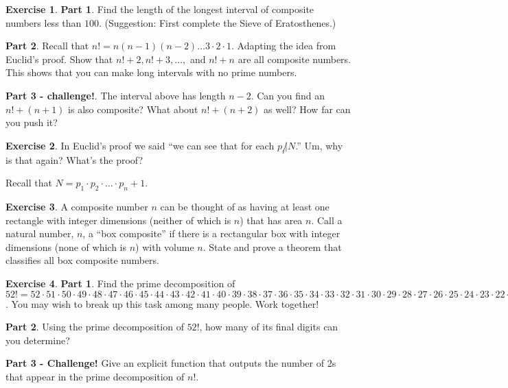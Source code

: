 \documentclass[11pt]{article}
\theoremstyle{definition}
\newtheorem{exercise}{Exercise}
\numberwithin{thm}{section}
\begin{document}
\begin{exercise} \textbf{Part 1}. Find the length of the longest interval of composite numbers less than $100$. (Suggestion: First complete the Sieve of Eratosthenes.)

\textbf{Part 2}. Recall that $n! = n(n-1)(n-2) \ldots 3 \cdot 2 \cdot 1$. Adapting the idea from Euclid's proof. Show that $n!+2, n!+3, \ldots,$ and $n!+ n$ are all composite numbers. This shows that you can make long intervals with no prime numbers.

\textbf{Part 3 - challenge!}. The interval above has length $n-2$. Can you find an $n!+ (n + 1)$ is also composite? What about $n! + (n+2)$ as well? How far can you push it?
\end{exercise}

\begin{exercise} In Euclid's proof we said ``we can see that for each $p_i \not | N$.'' Um, why is that again? What's the proof?

Recall that $N = p_1 \cdot p_2 \cdot \ldots \cdot p_n + 1$.
\end{exercise}

\begin{exercise} A composite number $n$ can be thought of as having at least one rectangle with integer dimensions (neither of which is $n$) that has area $n$. Call a natural number, $n$, a ``box composite'' if there is a rectangular box with integer dimensions (none of which is $n$) with volume $n$. State and prove a theorem that classifies all box composite numbers.
\end{exercise}

\begin{exercise} \textbf{Part 1}. Find the prime decomposition of $52! = 52 \cdot 51 \cdot 50 \cdot 49 \cdot 48 \cdot 47 \cdot 46 \cdot 45 \cdot 44 \cdot 43 \cdot 42 \cdot 41 \cdot 40 \cdot 39 \cdot 38 \cdot 37 \cdot 36 \cdot 35 \cdot 34 \cdot 33 \cdot 32 \cdot 31 \cdot 30 \cdot 29 \cdot 28 \cdot 27 \cdot 26 \cdot 25 \cdot 24 \cdot 23 \cdot 22 \cdot 21 \cdot 20 \cdot 19 \cdot 18 \cdot 17 \cdot 16 \cdot 15 \cdot 14 \cdot 13 \cdot 12 \cdot 11 \cdot 10 \cdot 9 \cdot 8 \cdot 7 \cdot 6 \cdot 5 \cdot 4 \cdot 3 \cdot 2 \cdot 1$. You may wish to break up this task among many people. Work together!

\textbf{Part 2}. Using the prime decomposition of $52!$, how many of its final digits can you determine?

\textbf{Part 3 - Challenge!} Give an explicit function that outputs the number of $2$s that appear in the prime decomposition of $n!$.
\end{exercise}
\end{document}

